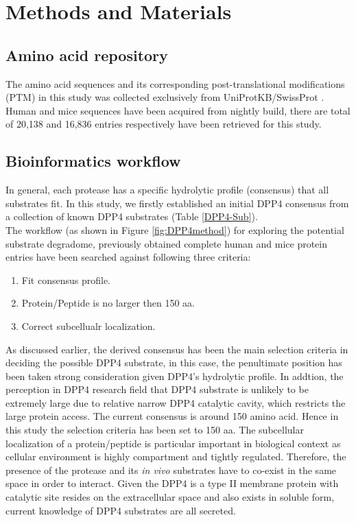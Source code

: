 \section{Methods and Materials}
\subsection{Amino acid repository}
The amino acid sequences and its corresponding post-translational modifications (PTM) in this study was collected exclusively from UniProtKB/SwissProt \cite{Magrane:2011fv}. Human and mice sequences have been acquired from nightly build, there are total of 20,138 and 16,836 entries respectively have been retrieved for this study. 
\\
\subsection{Bioinformatics workflow}
In general, each protease has a specific hydrolytic profile (consensus) that all substrates fit. In this study, we firstly established an initial DPP4 consensus from a collection of known DPP4 substrates (Table \ref{DPP4-Sub}). 
\\
The workflow (as shown in Figure \ref{fig:DPP4method}) for exploring the potential substrate degradome, previously obtained complete human and mice protein entries have been searched against following three criteria:
\begin{enumerate}
\item Fit consensus profile.
\item Protein/Peptide is no larger then 150 aa. 
\item Correct subcellualr localization.
\end{enumerate}

As discussed earlier, the derived consensus has been the main selection criteria in deciding the possible DPP4 substrate, in this case, the penultimate position has been taken strong consideration given DPP4's hydrolytic profile. In addtion, the perception in DPP4 research field that DPP4 substrate is unlikely to be extremely large due to relative narrow DPP4 catalytic cavity, which restricts the large protein access. The current consensus is around 150 amino acid. Hence in this study the selection criteria has been set to 150 aa. The subcellular localization of a protein/peptide is particular important in biological context as cellular environment is highly compartment and tightly regulated. Therefore, the presence of the protease and its \textit{in vivo} substrates have to co-exist in the same space in order to interact. Given the DPP4 is a type II membrane protein with catalytic site resides on the extracellular space and also exists in soluble form, current knowledge of DPP4 substrates are all secreted. 
\\
